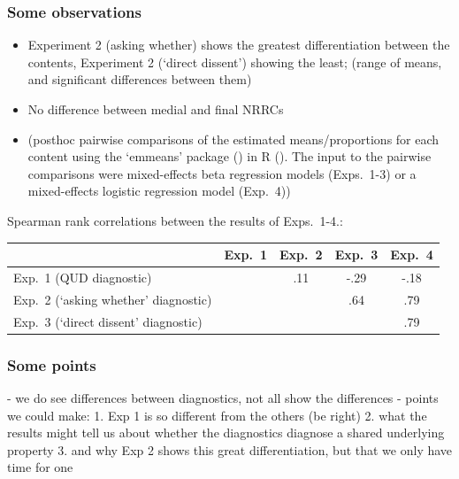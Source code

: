 \documentclass[compress, xcolor = dvipsnames, aspectratio=169]{beamer}
\begin{document}
	\begin{frame}[t]\frametitle{Some observations}\scriptsize
		\begin{itemize}
			\item Experiment 2 (asking whether) shows the greatest differentiation between the contents, Experiment 2 (`direct dissent') showing the least; (range of means, and significant differences between them)

			\item No difference between medial and final NRRCs

			\item  (posthoc pairwise comparisons of the estimated means/proportions for each content using the `emmeans' package (\citealt{emmeans}) in R (\citealt{r}). The input to the pairwise comparisons were mixed-effects beta regression models (Exps.~1-3) or a mixed-effects logistic regression model (Exp.~4))

		\end{itemize}
	
		Spearman rank correlations between the results of Exps.~1-4.:
		\begin{center}
			\begin{tabular}{l | c c c c}
		    & Exp.~1 & Exp.~2 & Exp.~3 & Exp.~4 \\ \hline
		    Exp.~1 (QUD diagnostic) & \cellcolor{lightgray} & .11 & -.29 & -.18 \\
		    Exp.~2 (`asking whether' diagnostic) & \cellcolor{lightgray} & \cellcolor{lightgray} & .64 &.79 \\
		    Exp.~3 (`direct dissent' diagnostic) & \cellcolor{lightgray}& \cellcolor{lightgray} & \cellcolor{lightgray} & .79  \\
		    \hline
		    \end{tabular}
		\end{center}
		
		  
	
	\end{frame}

	\begin{frame}[t]\frametitle{Some points}
	
		- we do see differences between diagnostics, not all show the differences
		- points we could make:
		1. Exp 1 is so different from the others (be right)
		2. what the results might tell us about whether the diagnostics diagnose a shared underlying property
		3. and why Exp 2 shows this great differentiation, but that we only have time for one
	
	\end{frame}
\end{document}
